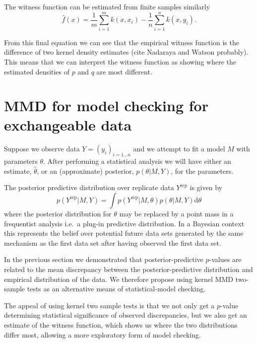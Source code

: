 \documentclass{article} %
\def\ie{i.e.\ }
\begin{document}
The witness function can be estimated from finite samples similarly
\begin{equation}
\hat{f}(x) = \frac{1}{m}\sum_{i=1}^{m}k(x,x_i) - \frac{1}{n}\sum_{i=1}^{n}k(x,y_i).
\end{equation}

From this final equation we can see that the empirical witness function is the difference of two kernel density estimates (cite Nadaraya and Watson probably).
This means that we can interpret the witness function as showing where the estimated densities of $p$ and $q$ are most different.

\section{MMD for model checking for exchangeable data}

Suppose we observe data $Y = (y_i)_{i=1\ldots n}$ and we attempt to fit a model $M$ with parameters $\theta$.
After performing a statistical analysis we will have either an estimate, $\hat\theta$, or an (approximate) posterior, $p(\theta|M,Y)$, for the parameters.

The posterior predictive distribution over replicate data $Y^\textrm{rep}$ is given by
\begin{equation}
p(Y^\textrm{rep}|M,Y) = \int p(Y^\textrm{rep}|M,\theta)p(\theta|M,Y)\mathrm{d}\theta
\end{equation}
where the posterior distribution for $\theta$ may be replaced by a point mass in a frequentist analysis \ie a plug-in predictive distribution.
In a Bayesian context this represents the belief over potential future data sets generated by the same mechanism as the first data set after having observed the first data set.


In the previous section we demonstrated that posterior-predictive $p$-values are related to the mean discrepancy between the posterior-predictive distribution and empirical distribution of the data.
We therefore propose using kernel MMD two-sample tests as an alternative means of statistical-model checking.

The appeal of using kernel two sample tests is that we not only get a $p$-value determining statistical significance of observed discrepancies, but we also get an estimate of the witness function, which shows us where the two distributions differ most, allowing a more exploratory form of model checking.
\end{document}
